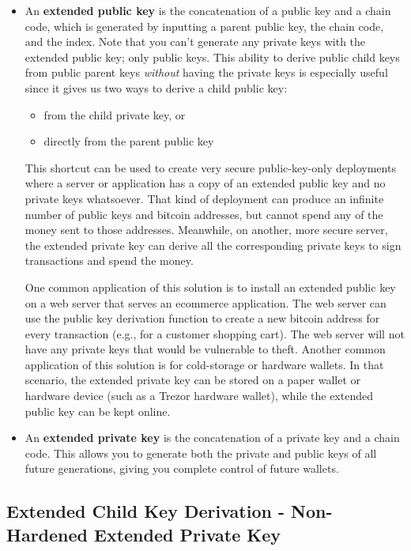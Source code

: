 \documentclass{article}
\begin{document}
    \begin{itemize}
      \item An \textbf{extended public key} is the concatenation of a public key and a chain code, which is generated by inputting a parent public key, the chain code, and the index. Note that you can't generate any private keys with the extended public key; only public keys. This ability to derive public child keys from public parent keys \textit{without} having the private keys is especially useful since it gives us two ways to derive a child public key:
      \begin{itemize}
        \item from the child private key, or
        \item directly from the parent public key
      \end{itemize}
      This shortcut can be used to create very secure public-key-only deployments where a server or application has a copy of an extended public key and no private keys whatsoever. That kind of deployment can produce an infinite number of public keys and bitcoin addresses, but cannot spend any of the money sent to those addresses. Meanwhile, on another, more secure server, the extended private key can derive all the corresponding private keys to sign transactions and spend the money.
      
      One common application of this solution is to install an extended public key on a web server that serves an ecommerce application. The web server can use the public key derivation function to create a new bitcoin address for every transaction (e.g., for a customer shopping cart). The web server will not have any private keys that would be vulnerable to theft. Another common application of this solution is for cold-storage or hardware wallets. In that scenario, the extended private key can be stored on a paper wallet or hardware device (such as a Trezor hardware wallet), while the extended public key can be kept online.
      
      \item An \textbf{extended private key} is the concatenation of a private key and a chain code. This allows you to generate both the private and public keys of all future generations, giving you complete control of future wallets.
    \end{itemize}

  \subsection{Extended Child Key Derivation - Non-Hardened Extended Private Key}
\end{document}
